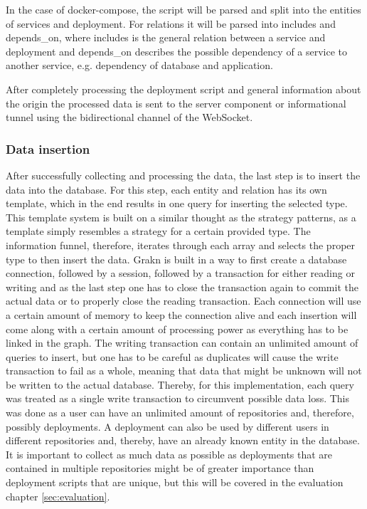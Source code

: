 In the case of docker-compose, the script will be parsed and split into the entities of services and deployment. For relations it will be parsed into includes and depends\_on, where includes is the general relation between a service and deployment and depends\_on describes the possible dependency of a service to another service, e.g. dependency of database and application.

After completely processing the deployment script and general information about the origin the processed data is sent to the server component or informational tunnel using the bidirectional channel of the WebSocket.

\subsubsection{Data insertion}
\label{sec:data_insertion}
After successfully collecting and processing the data, the last step is to insert the data into the database. For this step, each entity and relation has its own template, which in the end results in one query for inserting the selected type. This template system is built on a similar thought as the strategy patterns, as a template simply resembles a strategy for a certain provided type. The information funnel, therefore, iterates through each array and selects the proper type to then insert the data.
Grakn is built in a way to first create a database connection, followed by a session, followed by a transaction for either reading or writing and as the last step one has to close the transaction again to commit the actual data or to properly close the reading transaction.
Each connection will use a certain amount of memory to keep the connection alive and each insertion will come along with a certain amount of processing power as everything has to be linked in the graph.
The writing transaction can contain an unlimited amount of queries to insert, but one has to be careful as duplicates will cause the write transaction to fail as a whole, meaning that data that might be unknown will not be written to the actual database. Thereby, for this implementation, each query was treated as a single write transaction to circumvent possible data loss. This was done as a user can have an unlimited amount of repositories and, therefore, possibly deployments. A deployment can also be used by different users in different repositories and, thereby, have an already known entity in the database. It is important to collect as much data as possible as deployments that are contained in multiple repositories might be of greater importance than deployment scripts that are unique, but this will be covered in the evaluation chapter \ref{sec:evaluation}.

